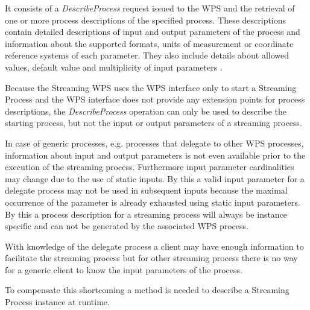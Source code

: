     It consists of a \emph{DescribeProcess} request issued to the \ac{WPS} and the retrieval of one or more process descriptions of the specified process. These descriptions contain detailed descriptions of input and output parameters of the process and information about the supported formats, units of measurement or coordinate reference systems of each parameter. They also include details about allowed values, default value and multiplicity of input parameters \citep{ogc:wps}.

    Because the Streaming \ac{WPS} uses the \ac{WPS} interface only to start a Streaming Process and the \ac{WPS} interface does not provide any extension points for process descriptions, the \emph{DescribeProcess} operation can only be used to describe the starting process, but not the input or output parameters of a streaming process.

    In case of generic processes, e.g. processes that delegate to other \ac{WPS} processes, information about input and output parameters is not even available prior to the execution of the streaming process. Furthermore input parameter cardinalities may change due to the use of static inputs. By this a valid input parameter for a delegate process may not be used in subsequent inputs because the maximal occurrence of the parameter is already exhausted using static input parameters. By this a process description for a streaming process will always be instance specific and can not be generated by the associated \ac{WPS} process.

    With knowledge of the delegate process a client may have enough information to facilitate the streaming process but for other streaming process there is no way for a generic client to know the input parameters of the process.

    To compensate this shortcoming a method is needed to describe a Streaming Process instance at runtime.


